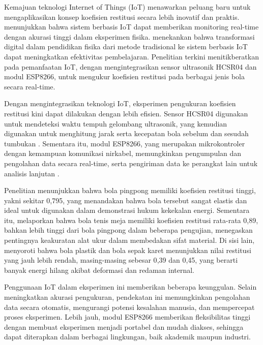  Kemajuan teknologi Internet of Things (IoT) menawarkan peluang baru untuk mengaplikasikan konsep koefisien restitusi secara lebih inovatif dan praktis. \citep{zhang2021iot} menunjukkan bahwa sistem berbasis IoT dapat memberikan monitoring real-time dengan akurasi tinggi dalam eksperimen fisika. \citep{anderson2019digital} menekankan bahwa transformasi digital dalam pendidikan fisika dari metode tradisional ke sistem berbasis IoT dapat meningkatkan efektivitas pembelajaran. Penelitian terkini menitikberatkan pada pemanfaatan IoT, dengan mengintegrasikan sensor ultrasonik HCSR04 dan modul ESP8266, untuk mengukur koefisien restitusi pada berbagai jenis bola secara real-time.

 Dengan mengintegrasikan teknologi IoT, eksperimen pengukuran koefisien restitusi kini dapat dilakukan dengan lebih efisien. Sensor HCSR04 digunakan untuk mendeteksi waktu tempuh gelombang ultrasonik, yang kemudian digunakan untuk menghitung jarak serta kecepatan bola sebelum dan sesudah tumbukan \citep{sadiku2015elements}. Sementara itu, modul ESP8266, yang merupakan mikrokontroler dengan kemampuan komunikasi nirkabel, memungkinkan pengumpulan dan pengolahan data secara real-time, serta pengiriman data ke perangkat lain untuk analisis lanjutan \citep{monk2016programming}.

 Penelitian \citep{juita2020penentuan} menunjukkan bahwa bola pingpong memiliki koefisien restitusi tinggi, yakni sekitar 0{,}795, yang menandakan bahwa bola tersebut sangat elastis dan ideal untuk digunakan dalam demonstrasi hukum kekekalan energi. Sementara itu, \citep{izzuddin2015menentukan} melaporkan bahwa bola tenis meja memiliki koefisien restitusi rata-rata 0{,}89, bahkan lebih tinggi dari bola pingpong dalam beberapa pengujian, menegaskan pentingnya keakuratan alat ukur dalam membedakan sifat material. Di sisi lain, \citep{clarania2012koefisien} menyoroti bahwa bola plastik dan bola sepak karet menunjukkan nilai restitusi yang jauh lebih rendah, masing-masing sebesar 0{,}39 dan 0{,}45, yang berarti banyak energi hilang akibat deformasi dan redaman internal.

 Penggunaan IoT dalam eksperimen ini memberikan beberapa keunggulan. Selain meningkatkan akurasi pengukuran, pendekatan ini memungkinkan pengolahan data secara otomatis, mengurangi potensi kesalahan manusia, dan mempercepat proses eksperimen. Lebih jauh, modul ESP8266 memberikan fleksibilitas tinggi dengan membuat eksperimen menjadi portabel dan mudah diakses, sehingga dapat diterapkan dalam berbagai lingkungan, baik akademik maupun industri.

